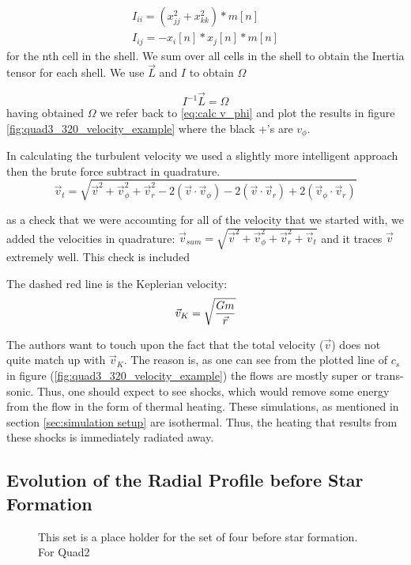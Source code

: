 \documentclass{emulateapj}
\newcommand{\be}{\begin{equation}}
\newcommand{\ee}{\end{equation}}
\begin{document}
\begin{gather*}
I_{ii} = (x_{jj}^2 + x_{kk}^2) * m[n]\\
I_{ij} = -x_{i}[n]*x_{j}[n] * m[n]
\label{eq:moment of inertia}
\end{gather*}
for the nth cell in the shell. We sum over all cells in the shell to obtain the Inertia tensor for each shell.
We use $\vec{L}$ and $I$ to obtain $\Omega$

\be
I^{-1}\vec{L} = \Omega
\label{eq:Obtain Omega}
\ee
having obtained $\Omega$ we refer back to \ref{eq:calc v_phi} and plot the results in figure \ref{fig:quad3_320_velocity_example} where the black +'s are $v_{\phi}$.

In calculating the turbulent velocity we used a slightly more intelligent approach then the brute force subtract in quadrature.
\be
\vec{v}_{t} = \sqrt{\vec{v}^2 + \vec{v}_{\phi}^2 + \vec{v}_{r}^2 - 2(\vec{v} \cdot \vec{v}_{\phi}) - 2(\vec{v} \cdot \vec{v}_{r}) + 2(\vec{v}_{\phi} \cdot \vec{v}_{r})}
\label{eq:Vrms subtraction}
\ee

as a check that we were accounting for all of the velocity that we started with, we added the velocities in quadrature: $\vec{v}_{sum} = \sqrt{\vec{v}^2 + \vec{v}_{\phi}^2 + \vec{v}_{r}^2 + \vec{v}_{t}}$ and it traces $\vec{v}$ extremely well. This check is included

The dashed red line is the Keplerian velocity:
\be
\vec{v}_{K} = \sqrt{G m \over \vec{r}}
\label{eq:Kepler velocity}
\ee

The authors want to touch upon the fact that the total velocity ($\vec{v}$) does not quite match up with $\vec{v}_{K}$. The reason is, as one can see from the plotted line of $c_s$ in figure (\ref{fig:quad3_320_velocity_example}) the flows are mostly super or trans-sonic. Thus, one should expect to see shocks, which would remove some energy from the flow in the form of thermal heating. These simulations, as mentioned in section \ref{sec:simulation setup} are isothermal. Thus, the heating that results from these shocks is immediately radiated away.
\subsection{Evolution of the Radial Profile before Star Formation}

\begin{figure}
\caption{This set is a place holder for the set of four before star formation. For Quad2
\label{fig:quad3_000_four}}
\end{figure}
\end{document}
